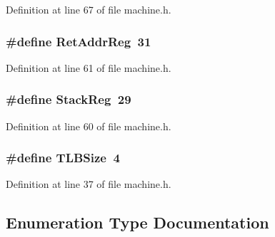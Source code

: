 Definition at line 67 of file machine.\+h.

\subsubsection[{Ret\+Addr\+Reg}]{\setlength{\rightskip}{0pt plus 5cm}\#define Ret\+Addr\+Reg~31}\label{machine_8h_afd61f2aedbb34ee6301a795667234d56}


Definition at line 61 of file machine.\+h.

\subsubsection[{Stack\+Reg}]{\setlength{\rightskip}{0pt plus 5cm}\#define Stack\+Reg~29}\label{machine_8h_a6702d1d5ad2fe3c3e40d9eedaaa2630f}


Definition at line 60 of file machine.\+h.

\subsubsection[{T\+L\+B\+Size}]{\setlength{\rightskip}{0pt plus 5cm}\#define T\+L\+B\+Size~4}\label{machine_8h_af372ca9ab0550891f1b5fd24ecffbbf6}


Definition at line 37 of file machine.\+h.



\subsection{Enumeration Type Documentation}
